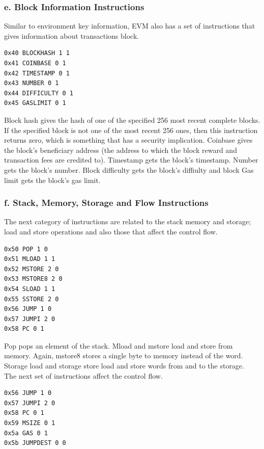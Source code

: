\subsubsection*{e. Block Information Instructions}
Similar to environment key information, EVM also has a set of instructions that gives information about transactions block.

\begin{lstlisting}[style=defaultStyle, caption={Block hash, coinbase, timestamp, number, difficulty and gas limit instructions.}]
0x40 BLOCKHASH 1 1
0x41 COINBASE 0 1
0x42 TIMESTAMP 0 1
0x43 NUMBER 0 1
0x44 DIFFICULTY 0 1
0x45 GASLIMIT 0 1
\end{lstlisting}

Block hash gives the hash of one of the specified 256 most recent complete blocks.
If the specified block is not one of the most recent 256 ones, then this instruction returns zero, which is something that has a security implication.
Coinbase gives the block's beneficiary address (the address to which the block reward and transaction fees are credited to).
Timestamp gets the block's timestamp.
Number gets the block's number.
Block difficulty gets the block's diffiulty and block Gas limit gets the block's gas limit.

\subsubsection*{f. Stack, Memory, Storage and Flow Instructions}

The next category of instructions are related to the stack memory and storage; load and store operations and also those that affect the control flow.

\begin{lstlisting}[style=defaultStyle, caption={Pop, mload, mstore, mstore8, sload and sstore instructions.}]
0x50 POP 1 0
0x51 MLOAD 1 1
0x52 MSTORE 2 0
0x53 MSTORE8 2 0
0x54 SLOAD 1 1
0x55 SSTORE 2 0
0x56 JUMP 1 0
0x57 JUMPI 2 0
0x58 PC 0 1
\end{lstlisting}

Pop pops an element of the stack.
Mload and mstore load and store from memory.
Again, mstore8 stores a single byte to memory instead of the word.
Storage load and storage store load and store words from and to the storage.\\

The next set of instructions affect the control flow.

\begin{lstlisting}[style=defaultStyle, caption={Jump, JumpI, PC, msize, gas and jumpdest instructions.}]
0x56 JUMP 1 0
0x57 JUMPI 2 0
0x58 PC 0 1
0x59 MSIZE 0 1
0x5a GAS 0 1
0x5b JUMPDEST 0 0
\end{lstlisting}


